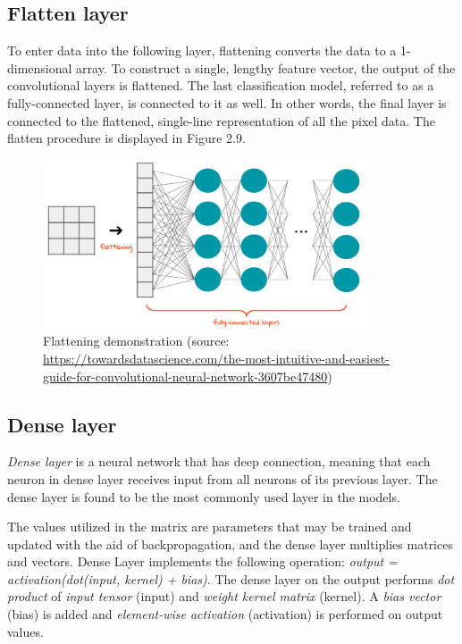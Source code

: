 \subsection{Flatten layer}
\hspace{0.5cm}To enter data into the following layer, flattening converts the data to a 1-dimensional array. To construct a single, lengthy feature vector, the output of the convolutional layers is flattened. The last classification model, referred to as a fully-connected layer, is connected to it as well. In other words, the final layer is connected to the flattened, single-line representation of all the pixel data. The flatten procedure is displayed in Figure 2.9.
\begin{figure}[ht]
	\centering
	\includegraphics[width=\linewidth, height=5cm,keepaspectratio]{figures/flattening.png}
   \caption{Flattening demonstration (source: \url{https://towardsdatascience.com/the-most-intuitive-and-easiest-guide-for-convolutional-neural-network-3607be47480})}
\end{figure}
\newpage
\subsection{Dense layer}
\hspace{0.5cm}\emph{Dense layer} is a neural network that has deep connection, meaning that each neuron in dense layer receives input from all neurons of its previous layer. The dense layer is found to be the most commonly used layer in the models.

The values utilized in the matrix are parameters that may be trained and updated with the aid of backpropagation, and the dense layer multiplies matrices and vectors. Dense Layer implements the following operation: \textit{output = activation(dot(input, kernel) + bias)}. The dense layer on the output performs \textit{dot product} of \textit{input tensor} (input) and \textit{weight kernel matrix} (kernel). A \textit{bias vector} (bias) is added and \textit{element-wise activation} (activation) is performed on output values. 

